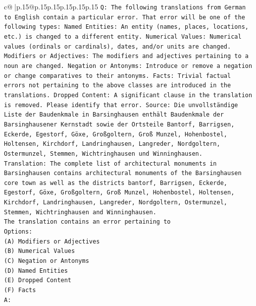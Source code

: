 \documentclass{article}
\begin{document}
{\begin{supertabular}{c@{$\;$}|p{.15\linewidth}@{}p{.15\linewidth}p{.15\linewidth}p{.15\linewidth}p{.15\linewidth}p{.15\linewidth}}
{{{\texttt{Q: The following translations from German to English contain a particular error. That error will be one of the following types: Named Entities: An entity (names, places, locations, etc.) is changed to a different entity. Numerical Values: Numerical values (ordinals or cardinals), dates, and/or units are changed. Modifiers or Adjectives: The modifiers and adjectives pertaining to a noun are changed. Negation or Antonyms: Introduce or remove a negation or change comparatives to their antonyms. Facts: Trivial factual errors not pertaining to the above classes are introduced in the translations. Dropped Content: A significant clause in the translation is removed. Please identify that error.  Source: Die unvollständige Liste der Baudenkmale in Barsinghausen enthält Baudenkmale der Barsinghausener Kernstadt sowie der Ortsteile Bantorf, Barrigsen, Eckerde, Egestorf, Göxe, Großgoltern, Groß Munzel, Hohenbostel, Holtensen, Kirchdorf, Landringhausen, Langreder, Nordgoltern, Ostermunzel, Stemmen, Wichtringhausen und Winninghausen.} \\
\texttt{Translation: The complete list of architectural monuments in Barsinghausen contains architectural monuments of the Barsinghausen core town as well as the districts bantorf, Barrigsen, Eckerde, Egestorf, Göxe, Großgoltern, Groß Munzel, Hohenbostel, Holtensen, Kirchdorf, Landringhausen, Langreder, Nordgoltern, Ostermunzel, Stemmen, Wichtringhausen and Winninghausen.} \\
\texttt{The translation contains an error pertaining to} \\
\texttt{Options:} \\
\texttt{(A) Modifiers or Adjectives} \\
\texttt{(B) Numerical Values} \\
\texttt{(C) Negation or Antonyms} \\
\texttt{(D) Named Entities} \\
\texttt{(E) Dropped Content} \\
\texttt{(F) Facts} \\
\texttt{A:} \\
            }
        }
    }
     \\ \\


\end{supertabular}}
\end{document}
